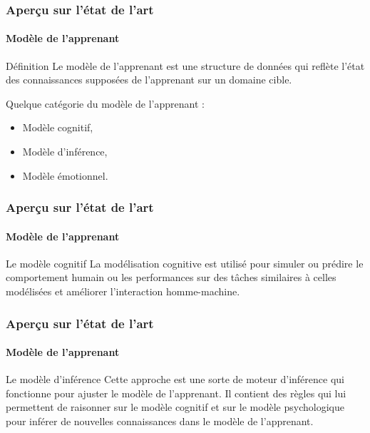 \documentclass[aspectratio=169,professionalfonts, 12pt]{beamer}
\begin{document}
\begin{frame}
  \frametitle{Aperçu sur l'état de l'art}
  \framesubtitle{Modèle de l’apprenant}
  \justifying 
  \begin{minipage}{\textwidth}
  \begin{block}{Définition}
    Le modèle de l’apprenant est une structure de données qui reflète l’état des connaissances supposées de l’apprenant sur un domaine cible.
  \end{block}
  \end{minipage} 
  \begin{minipage}{\textwidth}
  \begin{block}{}
    Quelque catégorie du modèle de l’apprenant :
    \begin{itemize}
      \item Modèle cognitif,
      \item Modèle d’inférence,
      \item Modèle émotionnel.
    \end{itemize}
  \end{block}
  \end{minipage}
\end{frame}

\begin{frame}
  \frametitle{Aperçu sur l'état de l'art}
  \framesubtitle{Modèle de l’apprenant}
  \justifying 
  \begin{minipage}{\textwidth}
  \begin{block}{Le modèle cognitif}
    La modélisation cognitive est utilisé pour simuler ou prédire le comportement humain ou les performances sur des tâches similaires à celles modélisées et améliorer l'interaction homme-machine.  \end{block}
  \end{minipage} 
\end{frame}

\begin{frame}
  \frametitle{Aperçu sur l'état de l'art}
  \framesubtitle{Modèle de l’apprenant}
  \justifying 
  \begin{minipage}{\textwidth}
  \begin{block}{Le modèle d’inférence}
    Cette approche est une sorte de moteur d’inférence qui fonctionne pour ajuster le modèle de l’apprenant. Il contient des règles qui lui permettent de raisonner sur le modèle cognitif et sur le modèle psychologique pour inférer de nouvelles connaissances dans le modèle de l’apprenant.  
  \end{block}
  \end{minipage} 
\end{frame}
\end{document}

